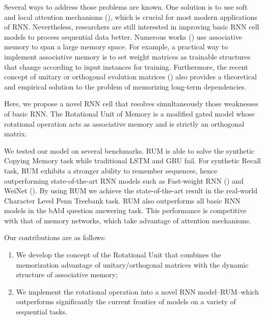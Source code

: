 \documentclass{article} \usepackage{iclr2018_conference,times}
\begin{document}
Several ways to address those problems are known. One solution is to use soft and local attention mechanisms (\cite{cho2014properties}), which is crucial for most modern applications of RNN. Nevertheless, researchers are still interested in improving basic RNN cell models to process sequential data better. Numerous works (\cite{graves2014neural, ba2016using}) use associative memory to span a large memory space. For example, a practical way to implement associative memory is to set weight matrices as trainable structures that change according to input instances for training. Furthermore, the recent concept of unitary or orthogonal evolution matrices (\cite{arjovsky2015unitary, jing2016tunable}) also provides a theoretical and empirical solution to the problem of memorizing long-term dependencies. 





Here, we propose a novel RNN cell that resolves simultaneously those weaknesses of basic RNN. The Rotational Unit of Memory is a modified gated model whose rotational operation acts as associative memory and is strictly an orthogonal matrix.

We tested our model on several benchmarks. RUM is able to solve the synthetic Copying Memory task while traditional LSTM and GRU fail. For synthetic Recall task, RUM exhibits a stronger ability to remember sequences, hence outperforming state-of-the-art RNN models such as Fast-weight RNN (\cite{ba2016using}) and WeiNet (\cite{zhang2017learning}). 
By using RUM we achieve the state-of-the-art result in the  real-world Character Level Penn Treebank task. RUM also outperforms all basic RNN models in the bAbI question answering task. This performance is competitive with that of memory networks, which take advantage of attention mechanisms.



Our contributions are as follows:
\begin{enumerate}
    \item We develop the concept of the Rotational Unit that combines the memorization advantage of unitary/orthogonal matrices with the dynamic structure of associative memory;
    \item We implement the rotational operation into a novel RNN model--RUM--which outperforms significantly the current frontier of models on a variety of sequential tasks. 
    
    
\end{enumerate}
\end{document}
